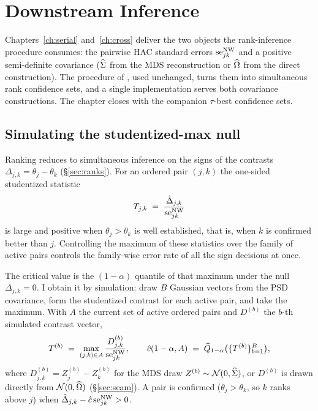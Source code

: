 \chapter{Downstream Inference}
\label{ch:downstream}

Chapters~\ref{ch:serial} and~\ref{ch:cross} deliver the two objects the rank-inference
procedure consumes: the pairwise HAC standard errors $\mathrm{se}^{\mathrm{NW}}_{jk}$ and a positive
semi-definite covariance ($\widehat{\Sigma}$ from the MDS reconstruction or $\widehat{\Omega}$ from the
direct construction). The procedure of \citet{mogstad2024}, used unchanged, turns them
into simultaneous rank confidence sets, and a single implementation serves both
covariance constructions. The chapter closes with the companion $\tau$-best confidence
sets.

\section{Simulating the studentized-max null}
\label{sec:studentized}

Ranking reduces to simultaneous inference on the signs of the contrasts
$\Delta_{j,k}=\theta_j-\theta_k$ (\S\ref{sec:ranks}). For an ordered pair $(j,k)$ the
one-sided studentized statistic
\begin{equation}
  T_{j,k} \;=\; \frac{\hat{\Delta}_{j,k}}{\mathrm{se}^{\mathrm{NW}}_{jk}}
\end{equation}
is large and positive when $\theta_j>\theta_k$ is well established, that is, when $k$ is
confirmed better than $j$. Controlling the maximum of these statistics over the family
of active pairs controls the family-wise error rate of all the sign decisions at once.

The critical value is the $(1-\alpha)$ quantile of that maximum under the null
$\Delta_{j,k}=0$. I obtain it by simulation: draw $B$ Gaussian vectors from the PSD
covariance, form the studentized contrast for each active pair, and take the maximum.
With $A$ the current set of active ordered pairs and $D^{(b)}$ the $b$-th simulated
contrast vector,
\begin{equation}
  T^{(b)} \;=\; \max_{(j,k)\in A}\frac{D^{(b)}_{j,k}}{\mathrm{se}^{\mathrm{NW}}_{jk}},
  \qquad
  \hat{c}(1-\alpha, A) \;=\; \widehat{Q}_{1-\alpha}\big(\{T^{(b)}\}_{b=1}^{B}\big),
  \label{eq:cv-sim}
\end{equation}
where $D^{(b)}_{j,k}=Z^{(b)}_j-Z^{(b)}_k$ for the MDS draw $Z^{(b)}\sim\mathcal{N}(0,\widehat{\Sigma})$,
or $D^{(b)}$ is drawn directly from $\mathcal{N}(0,\widehat{\Omega})$ (\S\ref{sec:seam}). A pair is
confirmed ($\theta_j>\theta_k$, so $k$ ranks above $j$) when
$\hat{\Delta}_{j,k} - \hat{c}\,\mathrm{se}^{\mathrm{NW}}_{jk} > 0$.

